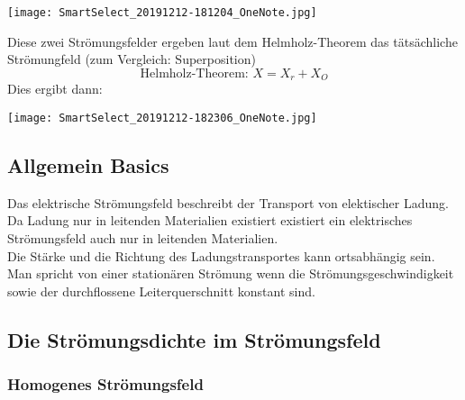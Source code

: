 \documentclass{article}
\begin{document}
    \begin{center}
        \texttt{[image: SmartSelect\_20191212-181204\_OneNote.jpg]}
    \end{center}
    Diese zwei Strömungsfelder ergeben laut dem Helmholz-Theorem das tätsächliche Strömungfeld (zum Vergleich: Superposition)
    \begin{equation}
        \textrm{Helmholz-Theorem: } X = X_r + X_O
    \end{equation}
    Dies ergibt dann:
    \begin{center}
        \texttt{[image: SmartSelect\_20191212-182306\_OneNote.jpg]}
    \end{center}
    \subsection{Allgemein Basics}
    Das elektrische Strömungsfeld beschreibt der Transport von elektischer Ladung. Da Ladung nur in leitenden Materialien existiert existiert ein elektrisches Strömungsfeld auch nur in leitenden Materialien. \\
    Die Stärke und die Richtung des Ladungstransportes kann ortsabhängig sein. Man spricht von einer stationären Strömung wenn die Strömungsgeschwindigkeit sowie der durchflossene Leiterquerschnitt konstant sind.
    \subsection{Die Strömungsdichte im Strömungsfeld}
    \subsubsection{Homogenes Strömungsfeld}
    
\end{document}
